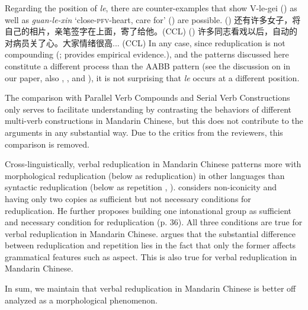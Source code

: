 \documentclass[fleqn,twoside]{article}
\begin{document}
{Regarding the position of \textit{le}, there are counter-examples that show V-le-gei () as well as \textit{guan-le-xin} `close-\textsc{pfv}-heart, care for' () are possible.
() 还有许多女子，将自己的相片，亲笔签字在上面，寄了给他。(CCL)
() 许多同志看戏以后，自动的对病员关了心。大家情绪很高... (CCL)
In any case, since reduplication is not compounding (\citealt[149--150]{Sui2018}; \citealt{GaoEtAl2021} provides empirical evidence.), 
and the patterns discussed here constitute a different process than the AABB pattern 
(see the discussion on \citealt{Xie2020} in our paper, also \citealt[Sec. 4.3]{Deng2013}, \citealt[Sec. 2]{SuiHu2016}, \citealt{Sui2018} and \citealt{Wang2023}),
it is not surprising that \textit{le} occurs at a different position.

The comparison with Parallel Verb Compounds and Serial Verb Constructions only serves to facilitate understanding
by contrasting the behaviors of different multi-verb constructions in Mandarin Chinese,
but this does not contribute to the arguments in any substantial way.
Due to the critics from the reviewers, this comparison is removed.

Cross-linguistically, verbal reduplication in Mandarin Chinese patterns more with morphological reduplication (below as reduplication) in other languages 
than syntactic reduplication (below as repetition \citealt[31]{Gil2005}, \citealt[1--2]{Forza2016}).
\citet[35--36]{Gil2005} considers non-iconicity and having only two copies as sufficient but not necessary conditions for reduplication.
He further proposes building one intonational group as sufficient and necessary condition for reduplication (p. 36).
All three conditions are true for verbal reduplication in Mandarin Chinese.
\citet[9]{Forza2016} argues that the substantial difference between reduplication and repetition lies in the fact that only the former affects grammatical features such as aspect.
This is also true for verbal reduplication in Mandarin Chinese.

In sum, we maintain that verbal reduplication in Mandarin Chinese is better off analyzed as a morphological phenomenon.

}
\end{document}
